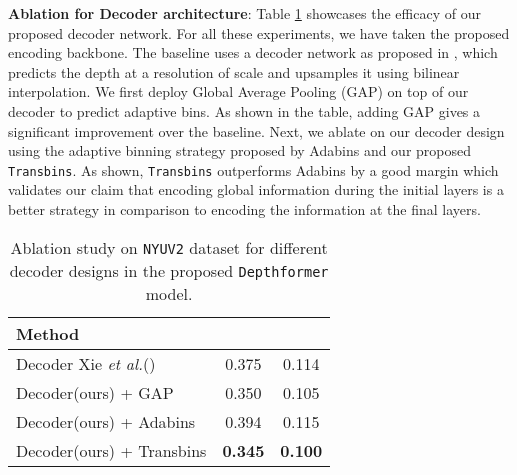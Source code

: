 \documentclass{article}
\newcommand{\myfirstpara}[1]{\noindent \textbf{#1}:}
\newcommand{\mypara}[1]{\vspace{0.5em} \myfirstpara{#1}}
\newcommand{\etal}{\textit{et al.}\xspace}
\newcommand{\Depthformer}{\texttt{Depthformer}\xspace}
\newcommand{\NYU}{\texttt{NYUV2}\xspace}
\newcommand{\Transbins}{\texttt{Transbins}\xspace}
\begin{document}
\begin{table}
\centering
{}
\caption{Performance of different state of the art multiscale-vision transformers for monocular depth estimation on the benchmark \NYU dataset.}
\label{tab:benchmark}
\end{table} 
\mypara{Ablation for Decoder architecture} 
Table \ref{tab:dec} showcases the efficacy of our proposed decoder network. For all these experiments, we have taken the proposed encoding backbone. The baseline uses a decoder network as proposed in \cite{segformer}, which predicts the depth at a resolution of  scale and upsamples it using bilinear interpolation. We first deploy Global Average Pooling (GAP) on top of our decoder to predict adaptive bins. As shown in the table, adding GAP gives a significant improvement over the baseline.
Next, we ablate on our decoder design using the adaptive binning strategy proposed by Adabins \cite{adabins} and our proposed \Transbins. As shown, \Transbins outperforms Adabins by a good margin which validates our claim that encoding global information during the initial layers is a better strategy in comparison to encoding the information at the final layers.

\begin{table}[]
\centering
\begin{tabular}{l|c|c}
\hline
Method                    &  &  \\
\hline
Decoder Xie \etal (\cite{segformer})                &   0.375   &     0.114    \\
Decoder(ours) + GAP               &    0.350  &         0.105 \\

Decoder(ours) + Adabins \cite{adabins}               &    0.394  &         0.115 \\

Decoder(ours) + Transbins &   \textbf{0.345}   &   \textbf{0.100}     \\
\hline
\end{tabular}
\caption{Ablation study on \NYU dataset for different decoder designs in the proposed \Depthformer model.}
\label{tab:dec}
\end{table}  
\end{document}
